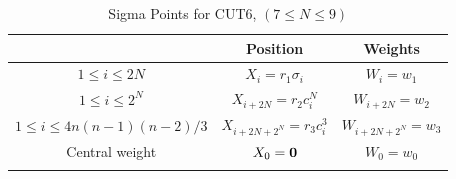 \documentclass[letterpaper, 10 pt, conference]{IEEEtran}  %
\begin{document}

\begin{table}
\caption{Sigma Points for CUT6, $(7\le N\le 9)$ }\vspace{-0.2in}

\small
\label{sigpointscut6N9}
\begin{center}
\begin{tabular}{c|c|c}
&Position & Weights\\
\hline
\hline
$1\le i\le 2N$ & $X_i=r_1\sigma_i$ & $W_i=w_1$\\
\hline\noalign{\smallskip}
$1 \le i \le 2^N$ & $X_{i+2N}=r_2c^N_i$ & $W_{i+2N}=w_2$\\
\hline\noalign{\smallskip}
$1 \le i \le 4n(n-1)(n-2)/{3}$ & $X_{i+2N+2^N}=r_3c^3_i$ & $W_{i+2N+2^N}=w_3$\\
\hline\noalign{\smallskip}
Central weight & $X_{0}={\bf 0} $ & $W_{0}=w_0$\\
\hline\noalign{\smallskip}
\multicolumn{3}{c}{$n=2N+2^N+4n(n-1)(n-2)/{3}+1$} \\
\hline
\end{tabular}
\end{center}\vspace{-0.2in}
\end{table} 
 
\end{document}
